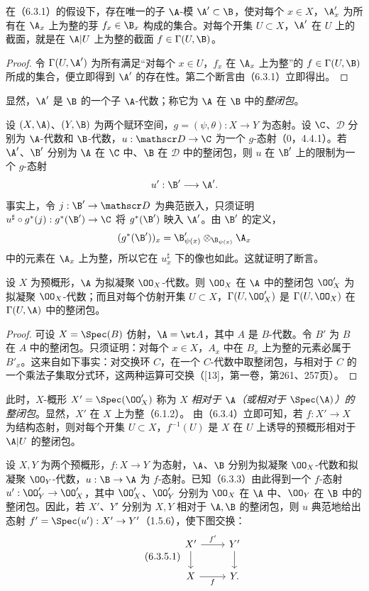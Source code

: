 在（6.3.1）的假设下，存在唯一的子 $\A$-模 $\A'\subset\B$，使对每个 $x\in X$，$\A'_x$ 为所有在 $\A_x$ 上为整的芽 $f_x\in\B_x$ 构成的集合。对每个开集 $U\subset X$，$\A'$ 在 $U$ 上的截面，就是在 $\A|U$ 上为整的截面 $f\in\Gamma(U,\B)$。
\begin{proof}
令 $\Gamma(U,\A')$ 为所有满足“对每个 $x\in U$，$f_x$ 在 $\A_x$ 上为整”的 $f\in\Gamma(U,\B)$ 所成的集合，便立即得到 $\A'$ 的存在性。第二个断言由（6.3.1）立即得出。
\end{proof}
显然，$\A'$ 是 $\B$ 的一个子 $\A$-代数；称它为 $\A$ 在 $\B$ 中的\emph{整闭包}。

设 $(X,\A)$、$(Y,\B)$ 为两个赋环空间，$g=(\psi,\theta):X\to Y$ 为态射。设 $\C$、$\mathscr D$ 分别为 $\A$-代数和 $\B$-代数，$u:\mathscr D\to\C$ 为一个 $g$-态射（0，4.4.1）。若 $\A'$、$\B'$ 分别为 $\A$ 在 $\C$ 中、$\B$ 在 $\mathscr D$ 中的整闭包，则 $u$ 在 $\B'$ 上的限制为一个 $g$-态射
\[
u':\B'\longrightarrow\A'.
\]
事实上，令 $j:\B'\to\mathscr D$ 为典范嵌入，只须证明
$u^\sharp\circ g^*(j):g^*(\B')\to\C$ 将 $g^*(\B')$ 映入 $\A'$。由 $\B'$ 的定义，
\[
(g^*(\B'))_x=\B'_{\psi(x)}\otimes_{\B_{\psi(x)}}\A_x
\]
中的元素在 $\A_x$ 上为整，所以它在 $u_x^\sharp$ 下的像也如此。这就证明了断言。

设 $X$ 为预概形，$\A$ 为拟凝聚 $\OO_X$-代数。则 $\OO_X$ 在 $\A$ 中的整闭包 $\OO'_X$ 为拟凝聚 $\OO_X$-代数；而且对每个仿射开集 $U\subset X$，$\Gamma(U,\OO'_X)$ 是 $\Gamma(U,\OO_X)$ 在 $\Gamma(U,\A)$ 中的整闭包。
\begin{proof}
可设 $X=\Spec(B)$ 仿射，$\A=\wt A$，其中 $A$ 是 $B$-代数。令 $B'$ 为 $B$ 在 $A$ 中的整闭包。只须证明：对每个 $x\in X$，$A_x$ 中在 $B_x$ 上为整的元素必属于 $B'_x$。这来自如下事实：对交换环 $C$，在一个 $C$-代数中取整闭包，与相对于 $C$ 的一个乘法子集取分式环，这两种运算可交换（[13]，第一卷，第261、257页）。
\end{proof}
此时，$X$-概形 $X'=\Spec(\OO'_X)$ 称为 $X$ \emph{相对于 $\A$（或相对于 $\Spec(\A)$）的整闭包}。显然，$X'$ 在 $X$ 上为整（6.1.2）。
由（6.3.4）立即可知，若 $f:X'\to X$ 为结构态射，则对每个开集 $U\subset X$，$f^{-1}(U)$ 是 $X$ 在 $U$ 上诱导的预概形相对于 $\A|U$ 的整闭包。

设 $X,Y$ 为两个预概形，$f:X\to Y$ 为态射，$\A$、$\B$ 分别为拟凝聚 $\OO_X$-代数和拟凝聚 $\OO_Y$-代数，$u:\B\to\A$ 为 $f$-态射。已知（6.3.3）由此得到一个 $f$-态射 $u':\OO'_Y\to\OO'_X$，其中 $\OO'_X$、$\OO'_Y$ 分别为 $\OO_X$ 在 $\A$ 中、$\OO_Y$ 在 $\B$ 中的整闭包。因此，若 $X'$、$Y'$ 分别为 $X,Y$ 相对于 $\A,\B$ 的整闭包，则 $u$ 典范地给出态射 $f'=\Spec(u'):X'\to Y'$（1.5.6），使下图交换：
\begin{equation}\tag{6.3.5.1}
\begin{tikzcd}
X'\arrow[r,"f'"]\arrow[d]&Y'\arrow[d]\\
X\arrow[r,"f"']&Y.
\end{tikzcd}
\end{equation}

